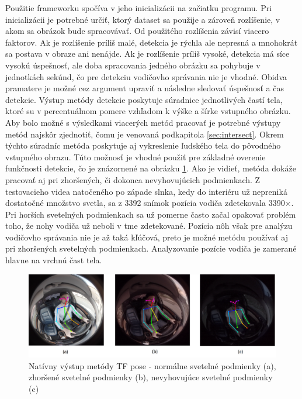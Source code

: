\documentclass[slovak,master,dept460,male,cpp,cpdeclaration]{diploma}
\begin{document}
Použitie frameworku spočíva v jeho inicializácii na začiatku programu. Pri inicializácii je potrebné určiť, ktorý dataset  sa použije a zároveň rozlíšenie, v akom  sa obrázok bude spracovávať. Od použitého rozlíšenia závisí viacero faktorov. Ak je rozlíšenie príliš malé, detekcia je rýchla ale nepresná a mnohokrát   sa postava v obraze ani nenájde. Ak je rozlíšenie príliš vysoké, detekcia má síce vysokú úspešnosť, ale doba spracovania  jedného obrázku sa  pohybuje v jednotkách sekúnd, čo pre detekciu vodičovho správania nie je vhodné. Obidva pramatere je možné cez argument upraviť a následne sledovať úspešnosť a čas detekcie. Výstup metódy detekcie poskytuje súradnice jednotlivých častí tela, ktoré su v percentuálnom pomere vzhľadom k výške a šírke vstupného obrázku. Aby bolo možné s výsledkami viacerých metód pracovať je potrebné  výstupy metód najskôr zjednotiť, čomu je venovaná podkapitola \ref{sec:intersect}. Okrem týchto súradníc  metóda poskytuje  aj vykreslenie  ľudského tela do pôvodného vstupného obrazu. Túto možnosť je vhodné použiť pre základné overenie funkčnosti detekcie, čo je znázornené na obrázku \ref{fig:tfResult}. Ako je vidieť, metóda dokáže pracovať aj pri zhoršených, či dokonca nevyhovujúcich podmienkach. Z testovacieho videa natočeného po západe slnka, kedy do interiéru už nepreniká dostatočné množstvo svetla,  sa z 3392 snímok pozícia vodiča zdetekovala 3390$\times$. Pri horších svetelných podmienkach sa už pomerne často začal opakovať problém toho, že nohy vodiča už neboli v tme zdetekované. Pozícia nôh však pre analýzu vodičovho správania nie je až taká kľúčová, preto je možné metódu používať aj pri zhoršených svetelných podmienkach. Analyzovanie pozície vodiča je zamerané hlavne na vrchnú čast tela. 

\begin{figure}[H]
	\centering
	\includegraphics[width=1\textwidth]{Figures/tf_result.png}
	\caption{Natívny výstup metódy TF pose - normálne svetelné podmienky (a), zhoršené svetelné podmienky (b), nevyhovujúce svetelné podmienky (c)}
	\label{fig:tfResult}
\end{figure}
\end{document}
